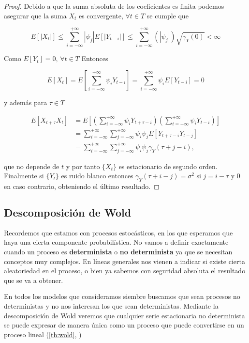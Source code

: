\begin{proof}
  Debido a que la suma absoluta de los coeficientes es finita podemos asegurar que la suma $X_t$ es convergente, $\forall t \in T$ se cumple que

  $$E[|X_t|] \leq \sum \limits^{+\infty}_{i = -\infty} |\psi_j| E[|Y_{t-i}|] \leq \sum \limits^{+\infty}_{i = -\infty} \left(|\psi_j|\right) \sqrt{\gamma_Y(0)} < \infty$$

  Como $E[Y_t] = 0, \, \forall t \in T$ Entonces

  $$E[X_t] = E\left[\sum \limits^{+\infty}_{i = -\infty} \psi_i Y_{t - i}\right] = \sum \limits^{+\infty}_{i = -\infty} \psi_i E[Y_{t-i}] = 0$$

  y además para $\tau \in T$

  $$\begin{aligned}
    E[X_{t+\tau}X_t] & = E\left[\left(\sum \limits^{+\infty}_{i = -\infty} \psi_i Y_{t + \tau - i}\right)\left(\sum \limits^{+\infty}_{i = -\infty} \psi_i Y_{t -i}\right)\right] \\
    & = \sum \limits^{+\infty}_{i = -\infty} \sum \limits^{+\infty}_{j = -\infty} \psi_i \psi_j E[Y_{t+\tau-i}Y_{t-j}] \\
    & = \sum \limits^{+\infty}_{i = -\infty}  \sum \limits^{+\infty}_{j = -\infty} \psi_i \psi_j \gamma_Y(\tau + j - i),
  \end{aligned}$$

  que no depende de $t$ y por tanto $\{X_t\}$ es estacionario de segundo orden. Finalmente si $\{Y_t\}$ es ruido blanco entonces $\gamma_Y(\tau + i - j) = \sigma^2$ si $j = i - \tau$ y 0 en caso contrario, obteniendo el último resultado.
\end{proof}

\subsection{Descomposición de Wold}

Recordemos que estamos con procesos estocásticos, en los que esperamos que haya una cierta componente probabilística. No vamos a definir exactamente cuando un proceso es \textbf{determinista} o \textbf{no determinista} ya que se necesitan conceptos muy complejos. En líneas generales nos vienen a indicar si existe cierta aleatoriedad en el proceso, o bien ya sabemos con seguridad absoluta el resultado que se va a obtener.

En todos los modelos que consideramos siembre buscamos que sean procesos no deterministas y no nos interesan los que sean deterministas. Mediante la descomposición de Wold veremos que cualquier serie estacionaria no determinista se puede expresar de manera única como un proceso que puede convertirse en un proceso lineal (\autoref{th:wold}, \cite{wold1938decomposition})

